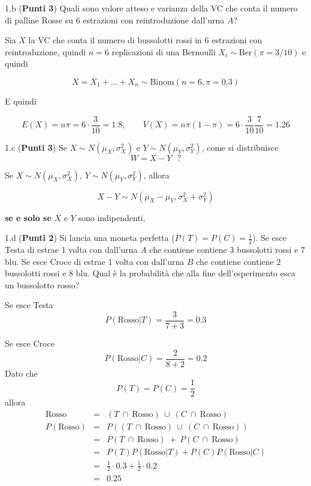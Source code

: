 \documentclass[
  11pt,
]{book}
\theoremstyle{mytheoremstyle}
\theoremstyle{mydefstyle}
\newenvironment{sol}
  {
  \begin{tcolorbox}[enhanced,breakable,arc=0.1mm,boxrule=1pt,colback=white,colframe=iblue,
  title=\bf \fontfamily{lmss}\selectfont \hspace{.5 cm} Soluzione,drop fuzzy shadow]

}{
\end{tcolorbox}
  }
\begin{document}
1.b (\textbf{Punti 3}) Quali sono valore atteso e varianza della VC che conta il numero di palline Rosse su 6 estrazioni con reintroduzione dall'urna \(A\)?

\begin{sol}
Sia \(X\) la VC che conta il numero di bussolotti rossi in 6 estrazioni con reintroduzione,
quindi \(n=6\) replicazioni di una Bernoulli \(X_i\sim\mbox{Ber}(\pi=3/10)\) e quindi

\[
X=X_1+...+X_n\sim\mbox{Binom}(n=6,\pi=0.3)
\]

E quindi

\[E(X)=n\pi=6\cdot\frac 3{10}=1.8,\qquad V(X)=n\pi(1-\pi)=6\cdot\frac 3{10}\frac 7{10}=1.26\]

\end{sol}

1.c (\textbf{Punti 3}) Se \(X\sim N(\mu_X,\sigma_X^2)\) e \(Y\sim N(\mu_Y,\sigma_Y^2)\), come si distribuisce
\[W=X-Y ~~~?\]

\begin{sol}
Se \(X\sim N(\mu_X,\sigma_X^2)\), \(Y\sim N(\mu_Y,\sigma_Y^2)\), allora

\[X-Y\sim N(\mu_X-\mu_Y,\sigma_X^2+\sigma_Y^2)\]

\textbf{se e solo se} \(X\) e \(Y\) sono indipendenti.

\end{sol}

1.d (\textbf{Punti 2}) Si lancia una moneta perfetta (\(P(T)=P(C)=\frac 12\)).
Se esce Testa di estrae 1 volta con dall'urna \(A\) che contiene contiene 3 bussolotti rossi e 7 blu.
Se esce Croce di estrae 1 volta con dall'urna \(B\) che contiene contiene 2 bussolotti rossi e 8 blu.
Qual è la probabilità che alla fine dell'esperimento esca un bussolotto rosso?

\begin{sol}
Se esce Testa
\[
P(\mbox{Rosso}|T)=\frac{3}{7+3}=0.3
\]

Se esce Croce
\[
P(\mbox{Rosso}|C)=\frac{2}{8+2}=0.2
\]
Dato che
\[
P(T)=P(C)=\frac 12
\]
allora
\begin{eqnarray*}
\mbox{Rosso}&=& (T~\cap~\mbox{Rosso})~\cup~ (C~\cap~\mbox{Rosso})\\
P(\mbox{Rosso})&=&P((T~\cap~\mbox{Rosso})~\cup~ (C~\cap~\mbox{Rosso}))\\
&=&P(T~\cap~\mbox{Rosso})~+~ P(C~\cap~\mbox{Rosso})\\
&=&P(T)P(\mbox{Rosso}|T)+P(C)P(\mbox{Rosso}|C)\\
&=&\frac 12\cdot 0.3+\frac 12 \cdot 0.2\\
&=&0.25
\end{eqnarray*}

\end{sol}
\end{document}

